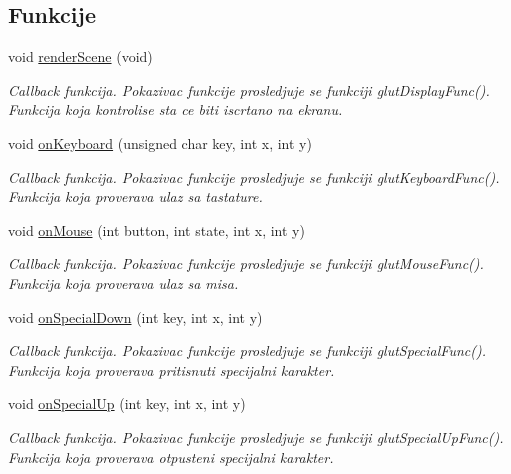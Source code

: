 \subsection*{Funkcije}
\begin{DoxyCompactItemize}
\item 
void \hyperlink{namespacecore_a1c3be366234e051e17b4b45f40c18960}{render\+Scene} (void)
\begin{DoxyCompactList}\small\item\em Callback funkcija. Pokazivac funkcije prosledjuje se funkciji glut\+Display\+Func(). Funkcija koja kontrolise sta ce biti iscrtano na ekranu. \end{DoxyCompactList}\item 
void \hyperlink{namespacecore_a179fad39a2b3f74cf7a0bffb578fce00}{on\+Keyboard} (unsigned char key, int x, int y)
\begin{DoxyCompactList}\small\item\em Callback funkcija. Pokazivac funkcije prosledjuje se funkciji glut\+Keyboard\+Func(). Funkcija koja proverava ulaz sa tastature. \end{DoxyCompactList}\item 
void \hyperlink{namespacecore_a581fd18fb14102b9234a113bc95341b4}{on\+Mouse} (int button, int state, int x, int y)
\begin{DoxyCompactList}\small\item\em Callback funkcija. Pokazivac funkcije prosledjuje se funkciji glut\+Mouse\+Func(). Funkcija koja proverava ulaz sa misa. \end{DoxyCompactList}\item 
void \hyperlink{namespacecore_a3ad12cad5f74289de4ad97762e453621}{on\+Special\+Down} (int key, int x, int y)
\begin{DoxyCompactList}\small\item\em Callback funkcija. Pokazivac funkcije prosledjuje se funkciji glut\+Special\+Func(). Funkcija koja proverava pritisnuti specijalni karakter. \end{DoxyCompactList}\item 
void \hyperlink{namespacecore_a590273d60aac2764ebf098f1b9aab3fe}{on\+Special\+Up} (int key, int x, int y)
\begin{DoxyCompactList}\small\item\em Callback funkcija. Pokazivac funkcije prosledjuje se funkciji glut\+Special\+Up\+Func(). Funkcija koja proverava otpusteni specijalni karakter. \end{DoxyCompactList}\end{DoxyCompactItemize}
